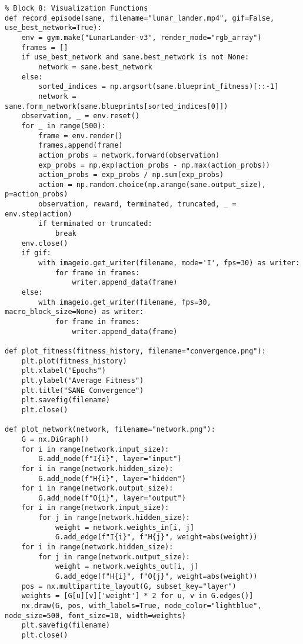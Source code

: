 \documentclass[a4paper,12pt]{article}
\begin{document}
\begin{lstlisting}
% Block 8: Visualization Functions
def record_episode(sane, filename="lunar_lander.mp4", gif=False, use_best_network=True):
    env = gym.make("LunarLander-v3", render_mode="rgb_array")
    frames = []
    if use_best_network and sane.best_network is not None:
        network = sane.best_network
    else:
        sorted_indices = np.argsort(sane.blueprint_fitness)[::-1]
        network = sane.form_network(sane.blueprints[sorted_indices[0]])
    observation, _ = env.reset()
    for _ in range(500):
        frame = env.render()
        frames.append(frame)
        action_probs = network.forward(observation)
        exp_probs = np.exp(action_probs - np.max(action_probs))
        action_probs = exp_probs / np.sum(exp_probs)
        action = np.random.choice(np.arange(sane.output_size), p=action_probs)
        observation, reward, terminated, truncated, _ = env.step(action)
        if terminated or truncated:
            break
    env.close()
    if gif:
        with imageio.get_writer(filename, mode='I', fps=30) as writer:
            for frame in frames:
                writer.append_data(frame)
    else:
        with imageio.get_writer(filename, fps=30, macro_block_size=None) as writer:
            for frame in frames:
                writer.append_data(frame)

def plot_fitness(fitness_history, filename="convergence.png"):
    plt.plot(fitness_history)
    plt.xlabel("Epochs")
    plt.ylabel("Average Fitness")
    plt.title("SANE Convergence")
    plt.savefig(filename)
    plt.close()

def plot_network(network, filename="network.png"):
    G = nx.DiGraph()
    for i in range(network.input_size):
        G.add_node(f"I{i}", layer="input")
    for i in range(network.hidden_size):
        G.add_node(f"H{i}", layer="hidden")
    for i in range(network.output_size):
        G.add_node(f"O{i}", layer="output")
    for i in range(network.input_size):
        for j in range(network.hidden_size):
            weight = network.weights_in[i, j]
            G.add_edge(f"I{i}", f"H{j}", weight=abs(weight))
    for i in range(network.hidden_size):
        for j in range(network.output_size):
            weight = network.weights_out[i, j]
            G.add_edge(f"H{i}", f"O{j}", weight=abs(weight))
    pos = nx.multipartite_layout(G, subset_key="layer")
    weights = [G[u][v]['weight'] * 2 for u, v in G.edges()]
    nx.draw(G, pos, with_labels=True, node_color="lightblue", node_size=500, font_size=10, width=weights)
    plt.savefig(filename)
    plt.close()


\end{lstlisting}
\end{document}
